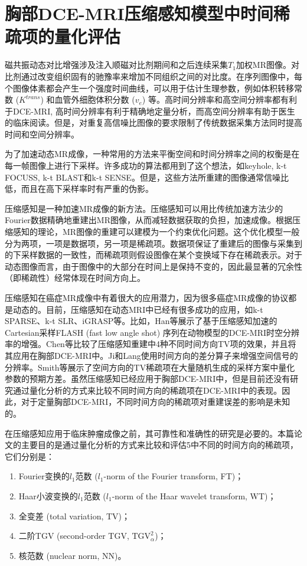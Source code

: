 \chapter{胸部DCE-MRI压缩感知模型中时间稀疏项的量化评估}
\label{chap:qetsr}
磁共振动态对比增强涉及注入顺磁对比剂期间和之后连续采集$T_1$加权MR图像\cite{Yankeelov2009}。对比剂通过改变组织固有的驰豫率来增加不同组织之间的对比度。在序列图像中，每个图像体素都会产生一个强度时间曲线，可以用于估计生理参数，例如体积转移常数 ($K^{trans}$) 和血管外细胞体积分数 ($v_e$) 等。高时间分辨率和高空间分辨率都有利于DCE-MRI, 高时间分辨率有利于精确地定量分析，而高空间分辨率有助于医生的临床阅读。但是，对重复高信噪比图像的要求限制了传统数据采集方法同时提高时间和空间分辨率。

为了加速动态MR成像，一种常用的方法来平衡空间和时间分辨率之间的权衡是在每一帧图像上进行下采样。许多成功的算法都用到了这个想法，如keyhole\cite{van1993}, k-t FOCUSS\cite{Hong2010k}, k-t BLAST和k-t SENSE\cite{Jeffrey2003k}。但是，这些方法所重建的图像通常信噪比低，而且在高下采样率时有严重的伪影。

压缩感知是一种加速MR成像的新方法\cite{Donoho2006Compressed,Candes2006Robust}。压缩感知可以用比传统加速方法少的Fourier数据精确地重建出MR图像，从而减轻数据获取的负担，加速成像。根据压缩感知的理论，MR图像的重建可以建模为一个约束优化问题。这个优化模型一般分为两项，一项是数据项，另一项是稀疏项。数据项保证了重建后的图像与采集到的下采样数据的一致性，而稀疏项则假设图像在某个变换域下存在稀疏表示。对于动态图像而言，由于图像中的大部分在时间上是保持不变的，因此最显著的冗余性（即稀疏性）经常体现在时间方向上。

压缩感知在癌症MR成像中有着很大的应用潜力\cite{smith2013}，因为很多癌症MR成像的协议都是动态的。目前，压缩感知在动态MRI中已经有很多成功的应用，如k-t SPARSE\cite{lustig2006}、k-t SLR\cite{Sajan2011Accelerated}、iGRASP\cite{igrasp}等。比如，Han等展示了基于压缩感知加速的Cartesian采样FLASH (fast low angle shot) \cite{han}序列在动物模型的DCE-MRI时空分辨率的增强。Chen\cite{chen}等比较了压缩感知重建中4种不同时间方向TV项的效果，并且将其应用在胸部DCE-MRI中。Ji和Lang\cite{ji2008}使用时间方向的差分算子来增强空间信号的分辨率。Smith\cite{smith2011,smith2012}等展示了空间方向的TV稀疏项在大量随机生成的采样方案中量化参数的预期方差。虽然压缩感知已经应用于胸部DCE-MRI中，但是目前还没有研究通过量化分析的方式来比较不同时间方向的稀疏项在DCE-MRI中的表现。因此，对于定量胸部DCE-MRI，不同时间方向的稀疏项对重建误差的影响是未知的。

在压缩感知应用于临床肿瘤成像之前，其可靠性和准确性的研究是必要的。本篇论文的主要目的是通过量化分析的方式来比较和评估5中不同的时间方向的稀疏项，它们分别是：
\begin{enumerate}
	\item Fourier变换的$l_1$范数 ($l_1$-norm of the Fourier transform, FT)；
	\item Haar小波变换的$l_1$范数 ($l_1$-norm of the Haar wavelet transform, WT)；
	\item 全变差 (total variation, TV)；
	\item 二阶TGV (second-order TGV, $\textrm{TGV}_{\alpha}^2$)；
	\item 核范数 (nuclear norm, NN)。
\end{enumerate}

